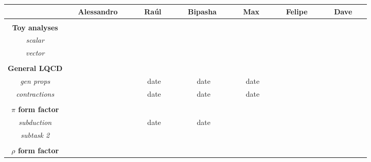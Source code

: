 \begin{center}
  \begin{tabular}{ c | c | c | c | c | c | c  }
    \hline
                           & \ \ Alessandro \ \  & \ \  Ra\'ul \ \  & \ \ Bipasha \ \  & \ \  Max \ \  & \ \  Felipe \ \  & \ \  Dave \ \   \\ \hline \\[-10pt] \hline
%
{\bf Toy analyses} &                          &                      &                        &                   &                    &                      \\ \hline
{\em scalar}        &                            &                      &                        &                   &                     &                        \\ \hline
{\em vector}        &                            &                      &                        &                   &                     &                       \\ \hline \\[-10pt] \hline
%
 {\bf General LQCD} &                      &                      &                        &                   &                     &                      \\ \hline
 {\em gen props} &                            & date              & date                & date           &                     &                      \\ \hline
 {\em contractions} &                         & date             & date                & date            &                     &                      \\ \hline \\[-10pt] \hline
%
 {\bf $\pi$ form factor}&                     &                      &                        &                   &                     &                      \\ \hline
 {\em subduction}  &                          & date              & date                &                   &                     &                      \\ \hline
 {\em subtask 2}  &                            &                      &                        &                   &                     &                      \\ \hline \\[-10pt] \hline
%
{\bf $\rho$ form factor} &                  &                      &                        &                   &                    &                      \\ \hline

\end{tabular}
\end{center}
